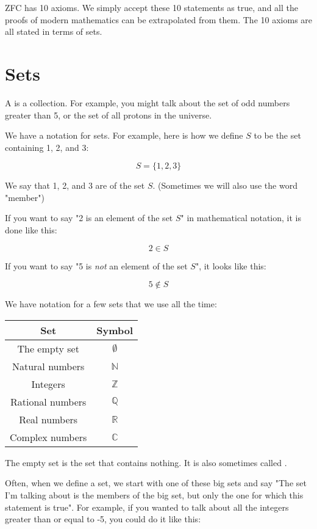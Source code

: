 ZFC has 10 axioms.  We simply accept these 10 statements as true, and
all the proofs of modern mathematics can be extrapolated from them.
The 10 axioms are all stated in terms of sets.

\section{Sets}

A  is a collection.  For example, you might talk about the set of
odd numbers greater than 5, or the set of all protons in the
universe.  

We have a notation for sets.  For example, here is how we define $S$ to
be the set containing 1, 2, and 3:

$$S = \{1, 2, 3\}$$

We say that 1, 2, and 3 are  of the set $S$.
(Sometimes we will also use the word "member")

If you want to say "2 is an element of the set $S$" in mathematical
notation, it is done like this:

$$ 2 \in S$$

If you want to say "5 is \textit{not} an element of the set $S$", it
looks like this:

$$ 5 \notin S$$

We have notation for a few sets that we use all the time:

\begin{tabular}{c|c}
Set & Symbol \\
\hline
The empty set & $\emptyset$ \\ \index{$\emptyset$}
Natural numbers & $\mathbb{N}$ \\ \index{$\mathbb{N}$}
Integers & $\mathbb{Z}$ \\ \index{$\mathbb{Z}$}
Rational numbers & $\mathbb{Q}$ \\ \index{$\mathbb{Q}$}
Real numbers & $\mathbb{R}$ \\ \index{$\mathbb{R}$}
Complex numbers & $\mathbb{C}$ \index{$\mathbb{C}$}
\end{tabular}

The empty set is the set that contains nothing.  It is also sometimes
called .

Often, when we define a set, we start with one of these big sets and
say "The set I'm talking about is the members of the big set, but only
the one for which this statement is true".  For example, if you wanted
to talk about all the integers greater than or equal to -5, you could
do it like this:

